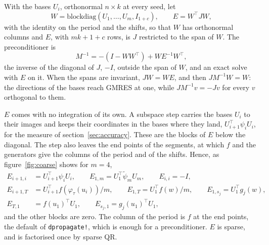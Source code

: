 \documentclass[11pt,a4paper]{article}
\newcommand{\code}[1]{\texttt{#1}}
\begin{document}
With the bases $U_i$, orthonormal $n \times k$ at every seed, let
\begin{equation}
  W = \mathrm{blockdiag}(U_1, \dots, U_m, I_{1 + c}), \qquad E = W^{\!\top} J W ,
\end{equation}
with the identity on the period and the shifts, so that $W$ has orthonormal columns and $E$, with
$mk + 1 + c$ rows, is $J$ restricted to the span of $W$. The preconditioner is
\begin{equation}
  M^{-1} = -(I - WW^{\!\top}) + W E^{-1} W^{\!\top} ,
  \label{eq:precond}
\end{equation}
the inverse of the diagonal of $J$, $-I$, outside the span of $W$, and an exact solve with $E$ on
it. When the spans are invariant, $JW = WE$, and then $JM^{-1}W = W$: the directions of the bases
reach GMRES at one, while $JM^{-1}v = -Jv$ for every $v$ orthogonal to them.

$E$ comes with no integration of its own. A subspace step carries the bases $U_i$ to their images
and keeps their coordinates in the bases where they land, $U_{i+1}^{\!\top} \psi_i U_i$, for the
measure of section~\ref{sec:accuracy}. These are the blocks of $E$ below the diagonal. The step
also leaves the end points of the segments, at which $f$ and the generators give the columns of
the period and of the shifts. Hence, as figure~\ref{fig:coarse} shows for $m = 4$,
\begin{equation}
\begin{aligned}
  E_{i+1,i} &= U_{i+1}^{\!\top} \psi_i U_i, \qquad E_{1,m} = U_1^{\!\top} \tilde\psi_m U_m, \qquad
  E_{i,i} = -I, \\
  E_{i+1,T} &= U_{i+1}^{\!\top} f(\varphi_\tau(u_i))/m, \qquad E_{1,T} = U_1^{\!\top} f(w)/m, \qquad
  E_{1,s_j} = U_1^{\!\top} g_j(w), \\
  E_{T,1} &= f(u_1)^{\!\top} U_1, \qquad E_{s_j,1} = g_j(u_1)^{\!\top} U_1,
\end{aligned}
\end{equation}
and the other blocks are zero. The column of the period is $f$ at the end points, the default of
\code{dpropagate!}, which is enough for a preconditioner. $E$ is sparse, and is factorised once by
sparse QR.
\end{document}
